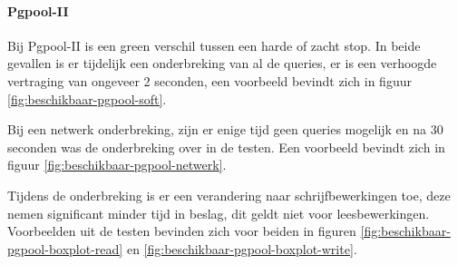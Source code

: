 \paragraph{Pgpool-II} Bij Pgpool-II is een green verschil tussen een harde of zacht stop. In beide gevallen is er tijdelijk een onderbreking van al de queries, er is een verhoogde vertraging van ongeveer 2 seconden, een voorbeeld bevindt zich in figuur \ref{fig:beschikbaar-pgpool-soft}. 

Bij een netwerk onderbreking, zijn er enige tijd geen queries mogelijk en na 30 seconden was de onderbreking over in de testen. Een voorbeeld bevindt zich in figuur \ref{fig:beschikbaar-pgpool-netwerk}.  

Tijdens de onderbreking is er een verandering naar schrijfbewerkingen toe, deze nemen significant minder tijd in beslag, dit geldt niet voor leesbewerkingen. Voorbeelden uit de testen bevinden zich voor beiden in figuren \ref{fig:beschikbaar-pgpool-boxplot-read} en \ref{fig:beschikbaar-pgpool-boxplot-write}. 

